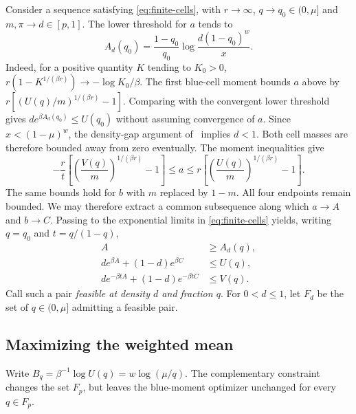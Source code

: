 Consider a sequence satisfying \eqref{eq:finite-cells}, with
$r\to\infty$, $q\to q_0\in(0,\mu]$ and $m,\pi\to d\in[p,1]$.
The lower threshold for $a$ tends to
\[
 A_d(q_0)=\frac{1-q_0}{q_0}\log\frac{d(1-q_0)^w}{x}.
\]
Indeed, for a positive quantity $K$ tending to $K_0>0$,
$r(1-K^{1/(\beta r)})\to-\log K_0/\beta$.
The first blue-cell moment bounds $a$ above by
$r[(U(q)/m)^{1/(\beta r)}-1]$. Comparing with the convergent lower
threshold gives $d e^{\beta A_d(q_0)}\le U(q_0)$ without assuming
convergence of $a$. Since $x<(1-\mu)^w$, the density-gap argument
of~\cite[Proposition~3.5, Step~6]{ZBS} implies $d<1$.
Both cell masses are therefore bounded away from zero eventually.
The moment inequalities give
\[
 -\frac r t\left[\left(\frac{V(q)}m\right)^{1/(\beta r)}-1\right]
 \le a\le
 r\left[\left(\frac{U(q)}m\right)^{1/(\beta r)}-1\right].
\]
The same bounds hold for $b$ with $m$ replaced by $1-m$.
All four endpoints remain bounded. We may therefore extract a common
subsequence along which $a\to A$ and $b\to C$.
Passing to the exponential limits in \eqref{eq:finite-cells} yields,
writing $q=q_0$ and $t=q/(1-q)$,
\begin{equation}\label{eq:feasible-pair}
 \begin{aligned}
 A&\ge A_d(q),\\
 d e^{\beta A}+(1-d)e^{\beta C}&\le U(q),\\
 d e^{-\beta tA}+(1-d)e^{-\beta tC}&\le V(q).
 \end{aligned}
\end{equation}
Call such a pair \emph{feasible at density $d$ and fraction $q$}.
For $0<d\le1$, let $F_d$ be the set of $q\in(0,\mu]$ admitting a
feasible pair.

\subsection{Maximizing the weighted mean}

Write $B_q=\beta^{-1}\log U(q)=w\log(\mu/q)$.
The complementary constraint changes the set $F_p$, but leaves the
blue-moment optimizer unchanged for every $q\in F_p$.

